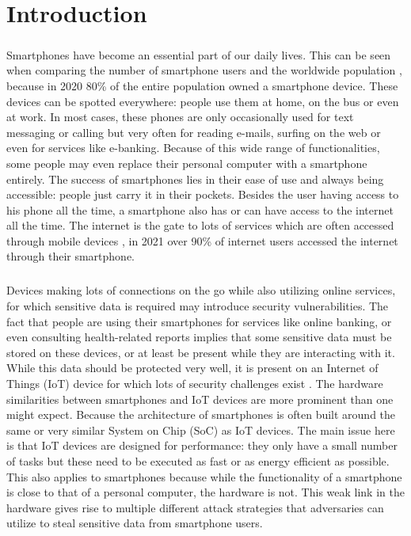 \chapter{Introduction}

\paragraph*{} 
Smartphones have become an essential part of our daily lives. This can be seen when comparing the number of smartphone users \cite{smartphones} and the worldwide population \cite{people}, because in 2020 80\% of the entire population owned a smartphone device. These devices can be spotted everywhere: people use them at home, on the bus or even at work. In most cases, these phones are only occasionally used for text messaging or calling but very often for reading e-mails, surfing on the web or even for services like e-banking. Because of this wide range of functionalities, some people may even replace their personal computer with a smartphone entirely. The success of smartphones lies in their ease of use and always being accessible: people just carry it in their pockets. Besides the user having access to his phone all the time, a smartphone also has or can have access to the internet all the time. The internet is the gate to lots of services which are often accessed through mobile devices \cite{internet}, in 2021 over 90\% of internet users accessed the internet through their smartphone.

\paragraph*{}
Devices making lots of connections on the go while also utilizing online services, for which sensitive data is required may introduce security vulnerabilities. The fact that people are using their smartphones for services like online banking, or even consulting health-related reports implies that some sensitive data must be stored on these devices, or at least be present while they are interacting with it. While this data should be protected very well, it is present on an Internet of Things (IoT) device for which lots of security challenges exist \cite{LitoussiMohamed2020Isca}. The hardware similarities between smartphones and IoT devices are more prominent than one might expect. Because the architecture of smartphones is often built around the same or very similar System on Chip (SoC) as IoT devices. The main issue here is that IoT devices are designed for performance: they only have a small number of tasks but these need to be executed as fast or as energy efficient as possible. This also applies to smartphones because while the functionality of a smartphone is close to that of a personal computer, the hardware is not. This weak link in the hardware gives rise to multiple different attack strategies that adversaries can utilize to steal sensitive data from smartphone users. 

